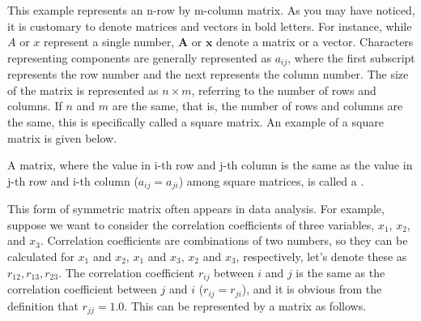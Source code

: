 \documentclass{ltjsbook}
\begin{document}



This example represents an n-row by m-column matrix. As you may have noticed, it is customary to denote matrices and vectors in bold letters. For instance, while $A$ or $x$ represent a single number, $\bm{A}$ or $\bm{x}$ denote a matrix or a vector.
Characters representing components are generally represented as $a_{ij}$, where the first subscript represents the row number and the next represents the column number. The size of the matrix is represented as $n \times m$, referring to the number of rows and columns. If $n$ and $m$ are the same, that is, the number of rows and columns are the same, this is specifically called a square matrix. An example of a square matrix is given below.




A matrix, where the value in i-th row and j-th column is the same as the value in j-th row and i-th column ($a_{ij}=a_{ji}$) among square matrices, is called a .



This form of symmetric matrix often appears in data analysis. For example, suppose we want to consider the correlation coefficients of three variables, $x_1$, $x_2$, and $x_3$. Correlation coefficients are combinations of two numbers, so they can be calculated for $x_1$ and $x_2$, $x_1$ and $x_3$, $x_2$ and $x_3$, respectively, let's denote these as $r_{12}, r_{13}, r_{23}$. The correlation coefficient $r_{ij}$ between $i$ and $j$ is the same as the correlation coefficient between $j$ and $i$ ($r_{ij}=r_{ji}$), and it is obvious from the definition that $r_{jj}=1.0$. This can be represented by a matrix as follows.
\end{document}
